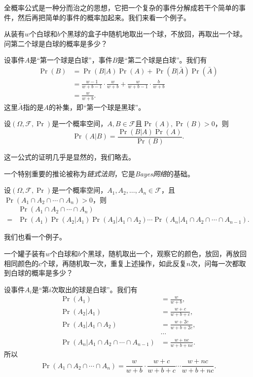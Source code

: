 全概率公式是一种分而治之的思想，它把一个复杂的事件分解成若干个简单的事件，然后再把简单的事件的概率加起来。我们来看一个例子。

\begin{example}
    从装有$w$个白球和$b$个黑球的盒子中随机地取出一个球，不放回，再取出一个球。问第二个球是白球的概率是多少？

    设事件$A$是“第一个球是白球”，事件$B$是“第二个球是白球”。我们有
\begin{align*}
    \Pr(B) &= \Pr(B|A)\Pr(A) + \Pr(B|\bar{A})\Pr(\bar{A}) \\
    &=\frac{w-1}{w+b-1}\cdot\frac{w}{w+b} + \frac{w}{w+b-1}\cdot\frac{b}{w+b}\\
    &=\frac{w}{w+b}.
\end{align*}
    这里$\bar A$指的是$A$的补集，即“第一个球是黑球”。
\end{example}

\begin{theorem}[贝叶斯公式]\label{thm:bayes}
设$(\Omega,\mathscr{F},\Pr)$是一个概率空间，$A,B\in\mathscr{F}$且$\Pr(A),\Pr(B)>0$，则
\[
    \Pr(A|B) = \frac{\Pr(B|A)\Pr(A)}{\Pr(B)}.
\]
\end{theorem}
这一公式的证明几乎是显然的，我们略去。

一个特别重要的推论被称为\emph{链式法则}，它是\emph{Bayes网络}的基础。

\begin{corollary}[链式法则]\label{cor:chain-rule}
设$(\Omega,\mathscr{F},\Pr)$是一个概率空间，$A_1,A_2,\ldots,A_n\in\mathscr{F}$，且$\Pr(A_1\cap A_2\cap\cdots\cap A_n)>0$，则
\begin{align*}
    &\Pr(A_1\cap A_2\cap\cdots\cap A_n)\\
    = &\Pr(A_1)\Pr(A_2|A_1)\Pr(A_3|A_1\cap A_2)\cdots\Pr(A_n|A_1\cap A_2\cap\cdots\cap A_{n-1}).
\end{align*}
\end{corollary}

我们也看一个例子。

\begin{example}[P\'olya的罐子]
    一个罐子装有$w$个白球和$b$个黑球，随机取出一个，观察它的颜色，放回，再放回相同颜色的$c$个球，再随机取一次，重复上述操作，如此反复$n$次，问每一次都取到白球的概率是多少？

    设事件$A_i$是“第$i$次取出的球是白球”。我们有
\begin{align*}
    \Pr(A_1)&=\frac{w}{w+b},\\
    \Pr(A_2|A_1)&=\frac{w+c}{w+b+c},\\
    \Pr(A_3|A_1\cap A_2)&=\frac{w+2c}{w+b+2c},\\
    &\cdots\\
    \Pr(A_n|A_1\cap A_2\cap\cdots\cap A_{n-1})&=\frac{w+nc}{w+b+nc}.
\end{align*}
    所以
\[
    \Pr(A_1\cap A_2\cap\cdots\cap A_n) = \frac{w}{w+b}\cdot\frac{w+c}{w+b+c}\cdots\frac{w+nc}{w+b+nc}.
\]
\end{example}

